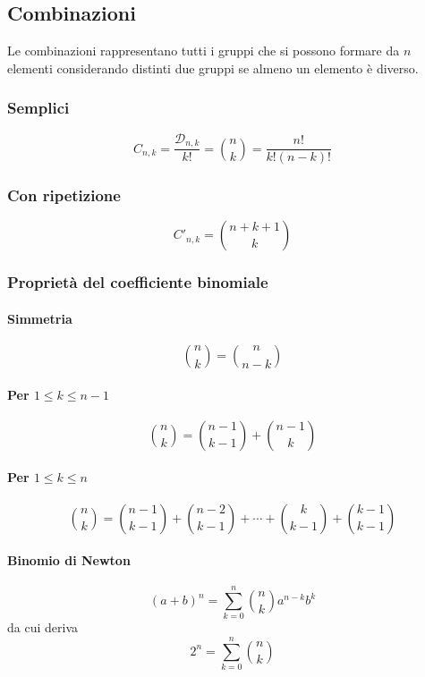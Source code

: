 \subsection{Combinazioni}
Le combinazioni rappresentano tutti i gruppi che si possono formare da $n$ elementi considerando 
distinti due gruppi se almeno un elemento è diverso.

\subsubsection{Semplici}
\begin{equation*}
C_{n,k} = \frac{\mathscr{D}_{n,k}}{k!} = \binom{n}{k} = \frac{n!}{k!(n-k)!}
\end{equation*}

\subsubsection{Con ripetizione}
\begin{equation*}
C'_{n,k} = \binom{n+k+1}{k}
\end{equation*}

\subsubsection{Proprietà del coefficiente binomiale}
\paragraph{Simmetria}
\begin{equation*}
\binom{n}{k} = \binom{n}{n-k}
\end{equation*}

\paragraph{Per $1\leq k \leq n-1$}
\begin{equation*}
\binom{n}{k} = \binom{n-1}{k-1}+\binom{n-1}{k}
\end{equation*}

\paragraph{Per $1\leq k\leq n$}
\begin{equation*}
\binom{n}{k} = \binom{n-1}{k-1}+\binom{n-2}{k-1}+\dotsb+\binom{k}{k-1}+\binom{k-1}{k-1}
\end{equation*}

\paragraph{Binomio di Newton}
\begin{equation*}
(a+b)^n = \sum\limits_{k=0}^{n}\binom{n}{k}a^{n-k}b^k
\end{equation*}
da cui deriva
\begin{equation*}
2^n = \sum\limits_{k=0}^{n}\binom{n}{k}
\end{equation*}

